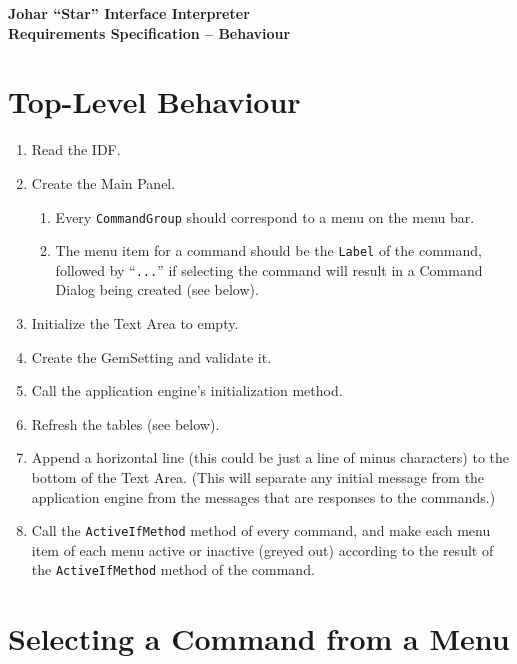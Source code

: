 \documentclass[11pt]{article}
\begin{document}
\begin{center} \bf \Large
Johar ``Star'' Interface Interpreter \\
Requirements Specification -- Behaviour
\end{center}

\section{Top-Level Behaviour}

\begin{enumerate}
\item Read the IDF.
\item Create the Main Panel.
  \begin{enumerate}
  \item Every {\tt CommandGroup} should correspond to a menu on the
    menu bar.
  \item The menu item for a command should be the {\tt Label}
    of the command, followed by ``{\tt ...}'' if selecting the 
    command will result in a Command Dialog being created (see below).
  \end{enumerate}
\item Initialize the Text Area to empty.
\item Create the GemSetting and validate it.
\item Call the application engine's initialization method.
\item Refresh the tables (see below).
\item Append a horizontal line (this could be just a line of minus
  characters) to the bottom of the Text Area.  (This will separate any
  initial message from the application engine from the messages that are
  responses to the commands.)
\item Call the {\tt ActiveIfMethod} method of every command, and make each menu
  item of each menu active or inactive (greyed out) according to the
  result of the {\tt ActiveIfMethod} method of the command.
\end{enumerate}

\section{Selecting a Command from a Menu}
\end{document}
